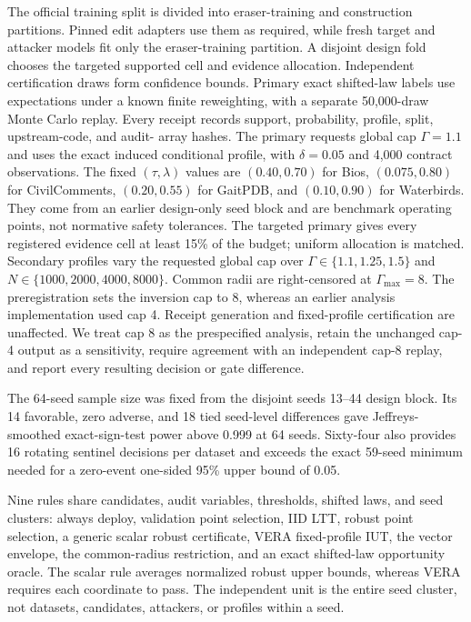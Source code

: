 The official training split is divided into eraser-training and construction
partitions. Pinned edit adapters use them as required, while fresh target and
attacker models fit only the eraser-training partition. A disjoint design fold chooses the targeted
supported cell and evidence allocation. Independent certification draws form
confidence bounds. Primary exact shifted-law labels use expectations under a
known finite reweighting, with a separate 50,000-draw Monte Carlo replay. Every
receipt records support, probability, profile, split, upstream-code, and audit-
array hashes. The primary requests global cap $\Gamma=1.1$ and uses the exact
induced conditional profile, with $\delta=0.05$ and 4,000 contract observations.
The fixed $(\tau,\lambda)$ values are $(0.40,0.70)$ for
Bios, $(0.075,0.80)$ for CivilComments, $(0.20,0.55)$ for GaitPDB, and
$(0.10,0.90)$ for Waterbirds. They come from an earlier design-only seed block
and are benchmark operating points, not normative safety tolerances. The
targeted primary gives every registered evidence cell at least 15\% of the
budget; uniform allocation is matched. Secondary profiles vary the requested
global cap over $\Gamma\in\{1.1,1.25,1.5\}$ and
$N\in\{1000,2000,4000,8000\}$. Common radii are right-censored at
$\Gamma_{\max}=8$.
The preregistration sets the inversion cap to 8, whereas an earlier analysis
implementation used cap 4. Receipt generation and fixed-profile certification
are unaffected. We treat cap 8 as the prespecified analysis, retain the
unchanged cap-4 output as a sensitivity, require agreement with an independent
cap-8 replay, and report every resulting decision or gate difference.

The 64-seed sample size was fixed from the disjoint seeds 13--44 design block.
Its 14 favorable, zero adverse, and 18 tied seed-level differences gave
Jeffreys-smoothed exact-sign-test power above 0.999 at 64 seeds. Sixty-four also
provides 16 rotating sentinel decisions per dataset and exceeds the exact
59-seed minimum needed for a zero-event one-sided 95\% upper bound of 0.05.

Nine rules share candidates, audit variables, thresholds, shifted laws, and
seed clusters: always deploy, validation point selection, IID LTT, robust point
selection, a generic scalar robust certificate, VERA fixed-profile IUT, the
vector envelope, the common-radius restriction, and an exact shifted-law
opportunity oracle. The scalar rule averages normalized robust upper bounds, whereas VERA
requires each coordinate to pass. The independent unit is the entire seed
cluster, not datasets, candidates, attackers, or profiles within a seed.

